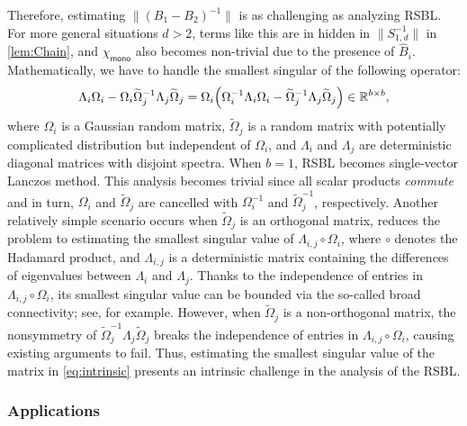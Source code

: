 \documentclass{article}
\newcommand{\chim}{\chi_{\mathsf{mono}}}
\newcommand{\R}{\mathbb{R}}
\providecommand{\norm}[1]{\lVert#1\rVert}
\begin{document}
Therefore, estimating $\norm{(B_{1}-B_{2})^{-1}}$ is as challenging  as analyzing RSBL. For more general situations $d> 2$,  terms like this are in hidden in $\norm{S_{1,d}^{-1}}$ in \cref{lem:Chain}, and $\chim$ also becomes non-trivial due to the presence of $\widehat{B}_{i}$. Mathematically, we have to handle the smallest singular of the following operator: 
\begin{equation}
    \label{eq:intrinsic}
    \Lambda_{i}\Omega_{i}-\Omega_{i}\widetilde{\Omega}_{j}^{-1}\Lambda_{j}\widetilde{\Omega}_{j} = \Omega_{i}\Bigl(\Omega_{i}^{-1}\Lambda_{i}\Omega_{i}-\widetilde{\Omega}_{j}^{-1}\Lambda_{j}\widetilde{\Omega}_{j}\Bigr)\in\R^{b\times b},
\end{equation} 
where $\Omega_{i}$ is a Gaussian random matrix, $\widetilde{\Omega}_{j}$ is a random matrix with potentially complicated distribution but independent of $\Omega_{i}$, and $\Lambda_{i}$ and $\Lambda_{j}$ are deterministic diagonal matrices with disjoint spectra. 
When $b=1$, RSBL becomes single-vector Lanczos method. This analysis becomes trivial since all scalar products \emph{commute} and in turn, $\Omega_{i}$ and $\widetilde{\Omega}_{j}$ are cancelled with $\Omega_{i}^{-1}$ and $\widetilde{\Omega}_{j}^{-1}$, respectively. 
Another relatively simple scenario occurs when $\widetilde{\Omega}_{j}$ is an orthogonal matrix,  reduces the problem to estimating the smallest singular value of $\Lambda_{i,j}\circ \Omega_{i}$, where $\circ$ denotes the Hadamard product, and $\Lambda_{i,j}$ is a deterministic matrix containing the differences of eigenvalues between $\Lambda_{i}$ and $\Lambda_{j}$. Thanks to the independence of entries in $\Lambda_{i,j}\circ \Omega_{i}$, its smallest singular value can be bounded via the so-called broad connectivity; see, \cite{Rudelson2016,Cook2018} for example. However, when $\widetilde{\Omega}_{j}$ is a non-orthogonal matrix, the nonsymmetry of $\widetilde{\Omega}_{j}^{-1}\Lambda_{j}\widetilde{\Omega}_{j}$ breaks the independence of entries in $\Lambda_{i,j}\circ \Omega_{i}$, causing existing arguments to fail. 
Thus, estimating the smallest singular value of the matrix in \cref{eq:intrinsic} presents an intrinsic challenge in the analysis of the RSBL. 


\subsubsection{Applications}
\label{sec:app}
\end{document}
